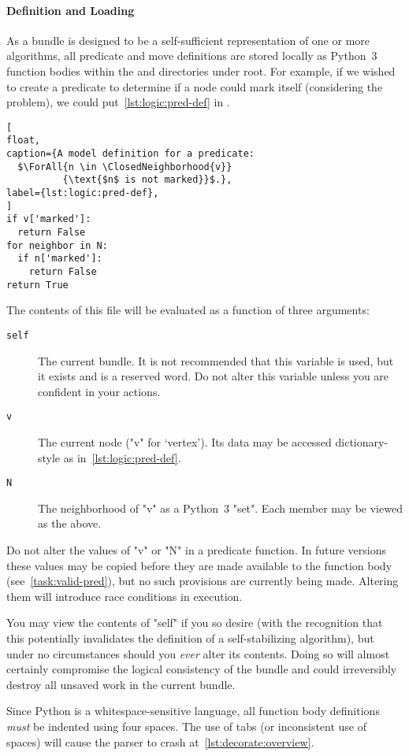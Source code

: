 \paragraph{Definition and Loading}
As a bundle is designed to be
  a self-sufficient representation
  of one or more algorithms,
  all predicate and move definitions are stored locally
  as Python~3 function bodies within the
   and  directories
  under root.
For example, if we wished to create a predicate
  to determine if a node could mark itself
  (considering the  problem),
  we could put~\autoref{lst:logic:pred-def} in
  .
\begin{lstlisting}[
float,
caption={A model definition for a predicate:
  $\ForAll{n \in \ClosedNeighborhood{v}}
          {\text{$n$ is not marked}}$.},
label={lst:logic:pred-def},
]
if v['marked']:
  return False
for neighbor in N:
  if n['marked']:
    return False
return True
\end{lstlisting} %
The contents of this file will be evaluated as
  a function of three arguments:
\begin{description}
\item[\texttt{self}] The current bundle.
  It is not recommended that this variable is used,
    but it exists and is a reserved word.
  Do not alter this variable unless you are confident in your actions.
\item[\texttt{v}] The current node ("v" for \enquote*{vertex}).
  Its data may be accessed dictionary-style as in~\autoref{lst:logic:pred-def}.
\item[\texttt{N}] The neighborhood of "v" as a Python~3 "set".
  Each member may be viewed as the above.
\end{description} %
\begin{warning}
  Do not alter the values of "v" or "N" in a predicate function.
  In future versions these values may be copied
    before they are made available to the function body (see~\autoref{task:valid-pred}),
    but no such provisions are currently being made.
  Altering them will introduce race conditions in execution.
\end{warning} %
\begin{warning}
  You may view the contents of "self" if you so desire
    (with the recognition that this potentially invalidates
    the definition of a self-stabilizing algorithm),
  but under no circumstances should you \emph{ever} alter its contents.
  Doing so will almost certainly compromise the logical consistency
    of the bundle and could irreversibly destroy all unsaved work
    in the current bundle.
\end{warning} %
\begin{warning}
  Since Python is a whitespace-sensitive language,
    all function body definitions \emph{must} be indented
    using four spaces.
  The use of tabs (or inconsistent use of spaces)
    will cause the parser to crash at~\autoref{lst:decorate:overview}.
\end{warning} %

